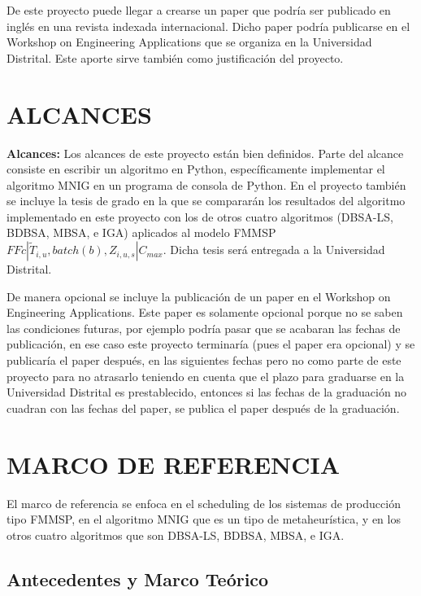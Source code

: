 \documentclass{article}
\def\notac_modelo{$FFc | \tilde{T}_{i, u}, batch(b), Z_{i, u, s} | C_{max}$}
\begin{document}
\vspace{\baselineskip}
De este proyecto puede llegar a crearse un paper que podría ser publicado en inglés en una revista indexada internacional. Dicho paper podría publicarse en el Workshop on Engineering Applications que se organiza en la Universidad Distrital. Este aporte sirve también como justificación del proyecto.

\section{ALCANCES}

\textbf{Alcances:} Los alcances de este proyecto están bien definidos. Parte del alcance consiste en escribir un algoritmo en Python, específicamente implementar el algoritmo MNIG en un programa de consola de Python. En el proyecto también se incluye la tesis de grado en la que se compararán los resultados del algoritmo implementado en este proyecto con los de otros cuatro algoritmos (DBSA-LS, BDBSA, MBSA, e IGA) aplicados al modelo FMMSP \linebreak \notac_modelo. Dicha tesis será entregada a la Universidad Distrital.

\vspace{\baselineskip}
De manera opcional se incluye la publicación de un paper en el Workshop on Engineering Applications. Este paper es solamente opcional porque no se saben las condiciones futuras, por ejemplo podría pasar que se acabaran las fechas de publicación, en ese caso este proyecto terminaría (pues el paper era opcional) y se publicaría el paper después, en las siguientes fechas pero no como parte de este proyecto para no atrasarlo teniendo en cuenta que el plazo para graduarse en la Universidad Distrital es prestablecido, entonces si las fechas de la graduación no cuadran con las fechas del paper, se publica el paper después de la graduación.

\section{MARCO DE REFERENCIA}

El marco de referencia se enfoca en el scheduling de los sistemas de producción tipo FMMSP, en el algoritmo MNIG que es un tipo de metaheurística, y en los otros cuatro algoritmos que son DBSA-LS, BDBSA, MBSA, e IGA.

\subsection{Antecedentes y Marco Teórico}
\end{document}
